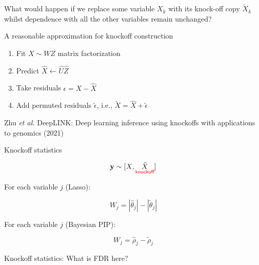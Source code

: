 \documentclass[
  ignorenonframetext,
  aspectratio=169]{beamer}
\begin{document}
\begin{frame}{}
\protect\hypertarget{section-2}{}
\Large

What would happen if we replace some variable \(X_{k}\) with its
knock-off copy \(\tilde{X}_{k}\) whilst dependence with all the other
variables remain unchanged?
\end{frame}

\begin{frame}{A reasonable approximation for knockoff construction}
\protect\hypertarget{a-reasonable-approximation-for-knockoff-construction}{}
\Large
\begin{enumerate}
\item<1-> Fit $X \sim W Z$ matrix factorization
\item<2-> Predict $\hat{X} \gets \hat{U} \hat{Z}$
\item<3-> Take residuals $\epsilon = X - \hat{X}$
\item<4-> Add permuted residuals $\tilde{\epsilon}$, i.e., $\tilde{X} = \hat{X} + \tilde{\epsilon}$
\end{enumerate}

\vfill

\tiny

Zhu \emph{et al.} DeepLINK: Deep learning inference using knockoffs with
applications to genomics (2021)
\end{frame}

\begin{frame}{Knockoff statistics}
\protect\hypertarget{knockoff-statistics}{}
\large

\[\mathbf{y} \sim [X, \underset{\textsf{\color{red} knockoff}}{\tilde{X}}]\]

For each variable \(j\) (Lasso):

\[W_{j} = |\hat{\theta}_{j}| - |\tilde{\theta}_{j}|\]

For each variable \(j\) (Bayesian PIP):

\[W_{j} = \hat{\rho}_{j} - \tilde{\rho}_{j}\]
\end{frame}

\begin{frame}{Knockoff statistics: What is FDR here?}
\protect\hypertarget{knockoff-statistics-what-is-fdr-here}{}
\scriptsize

\normalsize

\scriptsize

\normalsize

\scriptsize


\normalsize

\scriptsize


\normalsize
\end{frame}
\end{document}
